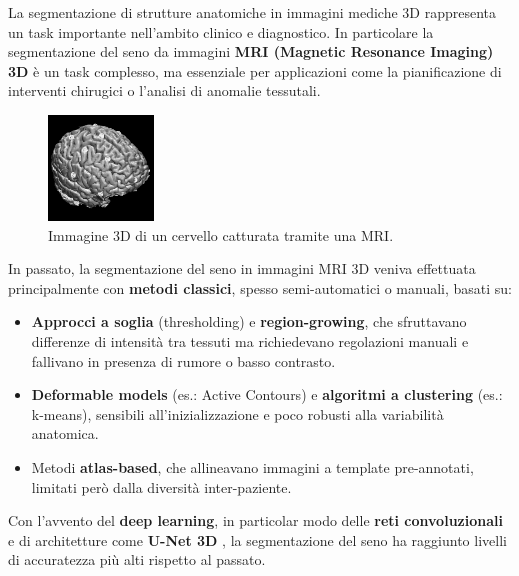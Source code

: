 
La segmentazione di strutture anatomiche in immagini mediche 3D rappresenta un task importante nell’ambito clinico e diagnostico. In particolare la segmentazione del seno da immagini \textbf{MRI (Magnetic Resonance Imaging) 3D} è un task complesso, ma essenziale per applicazioni come la pianificazione di interventi chirugici o l’analisi di anomalie tessutali.

\begin{figure} 
  	\centering 
 	\includegraphics[width=0.25\textwidth]{images/2025-08-08-20-08-17.png}  
	\caption{Immagine 3D di un cervello catturata tramite una MRI. \cite{brain_mri_3d}}
 \end{figure} 




In passato, la segmentazione del seno in immagini MRI 3D veniva effettuata principalmente con \textbf{metodi classici}, spesso semi-automatici o manuali, basati su:

\begin{itemize}
	\item \textbf{Approcci a soglia} (thresholding) e \textbf{region-growing}, che sfruttavano differenze di intensità tra tessuti ma richiedevano regolazioni manuali e fallivano in presenza di rumore o basso contrasto.
	\item \textbf{Deformable models} (es.: Active Contours) e \textbf{algoritmi a clustering} (es.: k-means), sensibili all’inizializzazione e poco robusti alla variabilità anatomica.
	\item Metodi \textbf{atlas-based}, che allineavano immagini a template pre-annotati, limitati però dalla diversità inter-paziente.
\end{itemize}

Con l’avvento del \textbf{deep learning}, in particolar modo delle \textbf{reti convoluzionali} e di architetture come \textbf{U-Net 3D} \cite{chen2021transunet}, la segmentazione del seno ha raggiunto livelli di accuratezza più alti rispetto al passato. 





